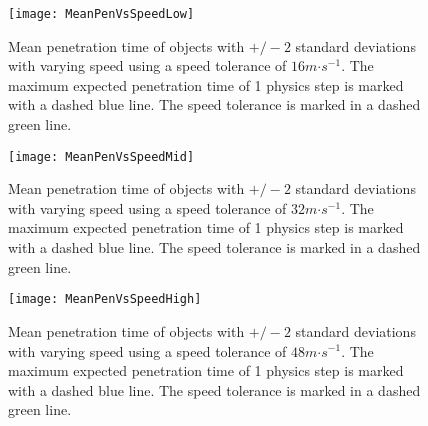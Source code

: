 \begin{figure}
	\centering
	\texttt{[image: MeanPenVsSpeedLow]}
	\caption{Mean penetration time of objects with $+/-2$ standard deviations with varying speed using a speed tolerance of $16m\mathord{\cdot}s^{-1}$. The maximum expected penetration time of 1 physics step is marked with a dashed blue line. The speed tolerance is marked in a dashed green line.}
	\label{fig_CollisionsPenVsSpeedLow}
\end{figure}
\begin{figure}
	\centering
	\texttt{[image: MeanPenVsSpeedMid]}
	\caption{Mean penetration time of objects with $+/-2$ standard deviations with varying speed using a speed tolerance of $32m\mathord{\cdot}s^{-1}$. The maximum expected penetration time of 1 physics step is marked with a dashed blue line. The speed tolerance is marked in a dashed green line.}
	\label{fig_CollisionsPenVsSpeedMid}
\end{figure}
\begin{figure}
	\centering
	\texttt{[image: MeanPenVsSpeedHigh]}
	\caption{Mean penetration time of objects with $+/-2$ standard deviations with varying speed using a speed tolerance of $48m\mathord{\cdot}s^{-1}$. The maximum expected penetration time of 1 physics step is marked with a dashed blue line. The speed tolerance is marked in a dashed green line.}
	\label{fig_CollisionsPenVsSpeedHigh}
\end{figure}
%
%

